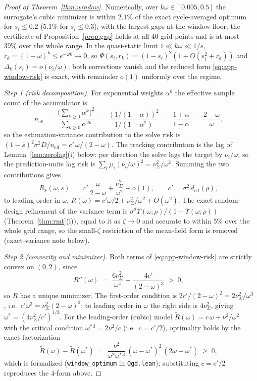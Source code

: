\begin{proof}[Proof of Theorem~\ref{thm:window}]
Numerically, over $k\omega \in [0.005,0.5]$ the surrogate's cubic minimizer is within $2.1\%$ of the exact cycle-averaged optimum for $s_i \le 0.2$ ($5.1\%$ for $s_i \le 0.3$), with the largest gaps at the window floor; the certificate of Proposition~\ref{prop:gap} holds at all $40$ grid points and is at most $39\%$ over the whole range.
In the quasi-static limit $1 \ll k\omega \ll 1/s$, $r_k=(1-\omega)^k \le e^{-\omega k} \to 0$, so $\Psi(s_i,r_k)=(1-s_i)^2(1+O(s_i^2+r_k))$ and $\Delta_k(s_i)=o(\nu_i/\omega)$; both corrections vanish and the reduced form \eqref{eq:app-window-risk} is exact, with remainder $o(1)$ uniformly over the regime.

\emph{Step 1 (risk decomposition).}
For exponential weights $\alpha^k$ the effective sample count of the accumulator is
\[
  n_{\mathrm{eff}}
  \;=\; \frac{\bigl(\sum_{k \ge 0} \alpha^k\bigr)^2}{\sum_{k \ge 0} \alpha^{2k}}
  \;=\; \frac{(1/(1-\alpha))^2}{1/(1-\alpha^2)}
  \;=\; \frac{1 + \alpha}{1 - \alpha}
  \;=\; \frac{2-\omega}{\omega},
\]
so the estimation-variance contribution to the solve risk is $(1-\bar s)^2 \sigma^2 D/n_{\mathrm{eff}} = c'\,\omega/(2-\omega)$.
The tracking contribution is the lag of Lemma~\ref{lem:zerolag}(i) below: per direction the solve lags the target by $\nu_i/\omega$, so the prediction-units lag risk is $\sum_i \mu_i (\nu_i/\omega)^2 = \nu^2_\Sigma/\omega^2$.
Summing the two contributions gives
\begin{equation}
\label{eq:app-window-risk}
  R_k(\omega,s) \;=\; c'\,\frac{\omega}{2-\omega} + \frac{\nu^2_\Sigma}{\omega^2} + o(1),
  \qquad c' = \sigma^2\,d_{\mathrm{eff}}(\rho),
\end{equation}
to leading order in $\omega$, $R(\omega) = c'\omega/2 + \nu^2_\Sigma/\omega^2 + O(\omega^2)$.
The exact random-design refinement of the variance term is $\sigma^2\Upsilon(\omega;\rho)/(1-\Upsilon(\omega;\rho))$ (Theorem~\ref{thm:rmt}(i)), equal to it as $\zeta \to 0$ and accurate to within $5\%$ over the whole grid range, so the small-$\zeta$ restriction of the mean-field form is removed (exact-variance note below).

\emph{Step 2 (convexity and minimizer).}
Both terms of \eqref{eq:app-window-risk} are strictly convex on $(0, 2)$, since
\[
  R''(\omega) \;=\; \frac{6\nu^2_\Sigma}{\omega^4} + \frac{4c'}{(2-\omega)^3} \;>\; 0,
\]
so $R$ has a unique minimizer.
The first-order condition is $2c'/(2-\omega)^2 = 2\nu^2_\Sigma/\omega^3$, i.e.\ $c' \omega^3 = \nu^2_\Sigma (2 - \omega)^2$; to leading order in $\omega$ the right side is $4\nu^2_\Sigma$, giving $\omega^* = (4\nu^2_\Sigma/c')^{1/3}$.
For the leading-order (cubic) model $\widetilde R(\omega) = c\,\omega + \nu^2/\omega^2$ with the critical condition $\omega^{*\,3} = 2\nu^2/c$ (i.e.\ $c = c'/2$), optimality holds by the exact factorization
\[
  \widetilde R(\omega) - \widetilde R(\omega^*)
  \;=\; \frac{\nu^2}{\omega^2 \omega^{*\,3}}\,(\omega - \omega^*)^2\,(2\omega + \omega^*) \;\ge\; 0,
\]
which is formalized (\texttt{window\_optimum} in \texttt{Ogd.lean}); substituting $c = c'/2$ reproduces the 4-form above.


\end{proof}
